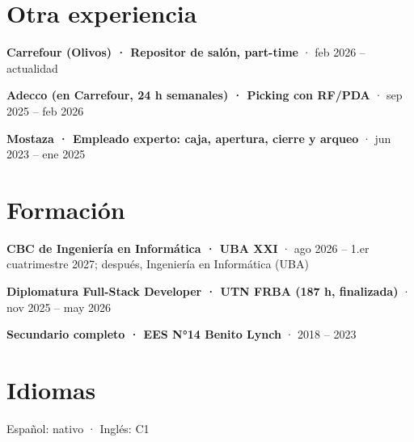 \documentclass[10pt,a4paper]{article}
\newcommand{\role}[2]{\textbf{#1} · #2\par}
\begin{document}
\section{Otra experiencia}
\role{Carrefour (Olivos) · Repositor de salón, part-time}{feb 2026 – actualidad}
\role{Adecco (en Carrefour, 24 h semanales) · Picking con RF/PDA}{sep 2025 – feb 2026}
\role{Mostaza · Empleado experto: caja, apertura, cierre y arqueo}{jun 2023 – ene 2025}

\section{Formación}
\role{CBC de Ingeniería en Informática · UBA XXI}{ago 2026 – 1.er cuatrimestre 2027; después, Ingeniería en Informática (UBA)}
\role{Diplomatura Full-Stack Developer · UTN FRBA (187 h, finalizada)}{nov 2025 – may 2026}
\role{Secundario completo · EES N°14 Benito Lynch}{2018 – 2023}

\section{Idiomas}
Español: nativo · Inglés: C1\par
\end{document}
